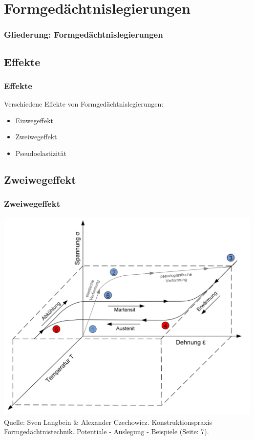\section{Formgedächtnislegierungen}

\begin{frame}[t]\frametitle{Gliederung: Formgedächtnislegierungen}
\tableofcontents[
currentsection,
subsectionstyle=show/show/hide
]
\end{frame}

\subsection{Effekte}
\label{fgl:effekte}
\begin{frame}[c]\frametitle{Effekte}
	Verschiedene Effekte von Formgedächtnislegierungen:
	\begin{itemize}
		\item{Einwegeffekt}
		\item{Zweiwegeffekt}
		\item{Pseudoelastizität}
	\end{itemize}
\end{frame}

\subsection{Zweiwegeffekt}
\label{fgl:zweiwegeffekt}
\begin{frame}[t]\frametitle{Zweiwegeffekt}
	\centering
	\includegraphics[height=0.5\textwidth]{medien/Verhalten_beim_Zweiwegeffekt.png}
	\\
	\tiny{Quelle: Sven Langbein \& Alexander Czechowicz. Konstruktionspraxis
	Formgedächtnistechnik. Potentiale - Auslegung - Beispiele (Seite: 7).}
\end{frame}

